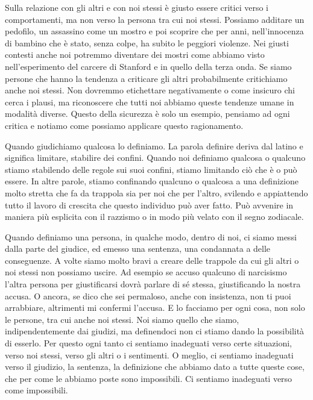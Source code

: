 \documentclass[12pt]{book} %
\begin{document}
Sulla relazione con gli altri e con noi stessi è giusto essere critici verso i comportamenti, ma non verso la persona tra cui noi stessi. 
Possiamo additare un pedofilo, un assassino
come un mostro e poi scoprire che per anni, nell'innocenza di bambino che è stato, senza colpe, ha
subito le peggiori violenze. Nei giusti contesti anche noi potremmo diventare dei mostri come abbiamo visto
nell'esperimento del carcere di Stanford e in quello della terza onda.
Se siamo persone che hanno la tendenza a criticare gli altri
probabilmente critichiamo anche noi stessi. Non dovremmo etichettare negativamente o come insicuro chi cerca i
plausi, ma riconoscere che tutti noi abbiamo queste tendenze umane in modalità diverse. Questo della sicurezza è solo
un esempio, pensiamo ad ogni critica e notiamo come possiamo applicare questo ragionamento.

Quando giudichiamo qualcosa lo definiamo. La parola definire deriva dal latino e significa limitare, stabilire dei
confini. Quando noi definiamo qualcosa o qualcuno stiamo stabilendo delle regole sui suoi confini, stiamo limitando ciò
che è o può essere. In altre parole, stiamo confinando qualcuno o qualcosa a una definizione molto stretta che fa da
trappola sia per noi che per l'altro, svilendo e appiattendo tutto il lavoro di crescita che questo individuo può aver fatto.
Può avvenire in maniera più esplicita con il razzismo o in modo più velato con il segno zodiacale.

Quando definiamo una persona, in qualche modo, dentro di noi, ci siamo messi dalla parte del giudice, ed emesso
una sentenza, una condannata a delle conseguenze. 
A volte siamo molto bravi a creare delle trappole da cui gli altri o noi stessi non possiamo uscire.
Ad esempio se accuso qualcuno di narcisismo l'altra persona per giustificarsi dovrà parlare di sé stessa, giustificando la nostra accusa. O ancora, se dico che sei permaloso, anche con insistenza, non ti puoi arrabbiare, altrimenti mi confermi l'accusa.
E lo facciamo per ogni cosa, non solo le persone, tra cui anche noi stessi. Noi siamo quello che siamo,
indipendentemente dai giudizi, ma definendoci non ci stiamo dando la possibilità di esserlo. Per questo ogni tanto ci
sentiamo inadeguati verso certe situazioni, verso noi stessi, verso gli altri o i sentimenti. O meglio, ci sentiamo
inadeguati verso il giudizio, la sentenza, la definizione che abbiamo dato a tutte queste cose, che per come le abbiamo
poste sono impossibili. Ci sentiamo inadeguati verso come impossibili.
\end{document}
